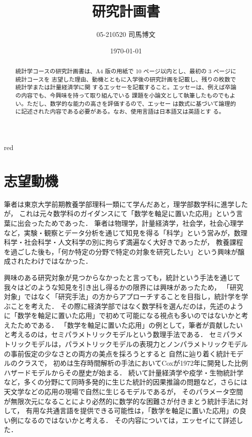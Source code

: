 \documentclass[uplatex, dvipdfmx]{jsarticle}
\title{研究計画書}
\author{05-210520 司馬博文}
\date{\today}
\begin{document}
\begin{tbox}{red}{}
    \begin{abstract}
        統計学コースの研究計画書は、A4 版の用紙で 10 ページ以内とし、最初の 3 ページに統計コースを
        志望した理由、動機とともに入学後の研究計画を記載し、残りの枚数で統計学または計量経済学に関
        するエッセーを記載すること。エッセーは、例えば卒論の内容でも、今興味を持って取り組んでいる
        課題を小論文として執筆したものでもよい。ただし、数学的な能力の高さを評価するので、エッセー
        は数式に基づいて論理的に記述された内容である必要がある。なお、使用言語は日本語又は英語とす
        る。
    \end{abstract}
\end{tbox}

\section*{志望動機}

筆者は東京大学前期教養学部理科一類にて学んだあと，理学部数学科に進学したが，
これは元々数学科のガイダンスにて「数学を軸足に置いた応用」という言葉に出会ったためであった．
筆者は物理学，計量経済学，社会学，社会心理学など，実験・観察とデータ分析を通じて知見を得る「科学」という営みが，数理科学・社会科学・人文科学の別に拘らず満遍なく大好きであったが，
教養課程を過ごした後も，「何か特定の分野で特定の対象を研究したい」という興味が醸成されたわけではなかった．

興味のある研究対象が見つからなかったと言っても，統計という手法を通じて我々はどのような知見を引き出し得るかの限界には興味があったため，
「研究対象」ではなく「研究手法」の方からアプローチすることを目指し，統計学を学ぶことを考えた．
その際に経済学部ではなく数学科を選んだのは，先述のように「数学を軸足に置いた応用」で初めて可能になる視点も多いのではないかと考えたためである．
「数学を軸足に置いた応用」の例として，筆者が貢献したいと考えるのは，セミパラメトリックモデルという数理手法である．
セミパラメトリックモデルは，パラメトリックモデルの表現力とノンパラメトリックモデルの事前仮定の少なさとの両方の美点を採ろうとすると
自然に辿り着く統計モデルのクラスで，
初めは生存時間解析の手法においてCoxが1972年に開発した比例ハザードモデルからその歴史が始まる．
続いて計量経済学や疫学・生物統計学など，多くの分野にて同時多発的に生じた統計的因果推論の問題など，さらには天文学などの応用の現場で自然に生じるモデルである\cite{Bickel}が，
そのパラメータ空間が無限次元になることにより必然的に数学的な困難さが付きまとう統計手法に対して，
有用な共通言語を提供できる可能性は，「数学を軸足に置いた応用」の良い例になるのではないかと考える．
その内容については，エッセイにて詳述した．
\end{document}
